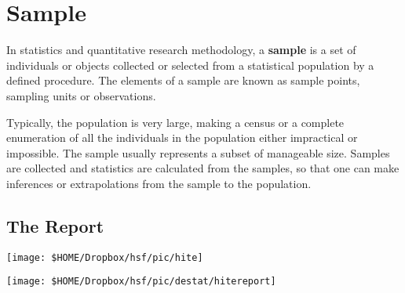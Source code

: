 \chapter{Sample}\label{sec:sampling}


In statistics and quantitative research methodology, a \textbf{sample} is a set of individuals or objects collected or selected from a statistical population by a defined procedure. The elements of a sample are known as sample points, sampling units or observations. 

Typically, the population is very large, making a census or a complete enumeration of all the individuals in the population either impractical or impossible. The sample usually represents a subset of manageable size. Samples are collected and statistics are calculated from the samples, so that one can make inferences or extrapolations from the sample to the population. 

\section{The \cite{Hite1976Hite} Report}
\begin{minipage}[t]{0.5\textwidth}
\begin{center}
	\texttt{[image: \$HOME/Dropbox/hsf/pic/hite]}
\end{center}
\end{minipage}
\begin{minipage}[t]{0.5\textwidth}
\begin{center}
	\texttt{[image: \$HOME/Dropbox/hsf/pic/destat/hitereport]}
	
\end{center}
\end{minipage}

